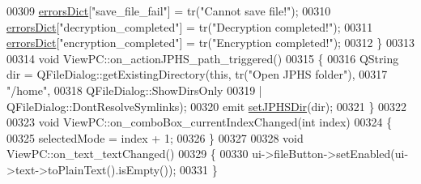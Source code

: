 \begin{DoxyCode}
00309     \hyperlink{class_view_p_c_aaf7f058e5589d65fec72a21abfd5629b}{errorsDict}[\textcolor{stringliteral}{"save\_file\_fail"}] = tr(\textcolor{stringliteral}{"Cannot save file!"});
00310     \hyperlink{class_view_p_c_aaf7f058e5589d65fec72a21abfd5629b}{errorsDict}[\textcolor{stringliteral}{"decryption\_completed"}] = tr(\textcolor{stringliteral}{"Decryption completed!"});
00311     \hyperlink{class_view_p_c_aaf7f058e5589d65fec72a21abfd5629b}{errorsDict}[\textcolor{stringliteral}{"encryption\_completed"}] = tr(\textcolor{stringliteral}{"Encryption completed!"});
00312 \}
00313 
00314 \textcolor{keywordtype}{void} ViewPC::on\_actionJPHS\_path\_triggered()
00315 \{
00316     QString dir = QFileDialog::getExistingDirectory(\textcolor{keyword}{this}, tr(\textcolor{stringliteral}{"Open JPHS folder"}),
00317                                                     \textcolor{stringliteral}{"/home"},
00318                                                     QFileDialog::ShowDirsOnly
00319                                                     | QFileDialog::DontResolveSymlinks);
00320     emit \hyperlink{class_view_p_c_ae81085836c0c01bc9556a5b27eb8d19c}{setJPHSDir}(dir);
00321 \}
00322 
00323 \textcolor{keywordtype}{void} ViewPC::on\_comboBox\_currentIndexChanged(\textcolor{keywordtype}{int} index)
00324 \{
00325     selectedMode = index + 1;
00326 \}
00327 
00328 \textcolor{keywordtype}{void} ViewPC::on\_text\_textChanged()
00329 \{
00330     ui->fileButton->setEnabled(ui->text->toPlainText().isEmpty());
00331 \}
\end{DoxyCode}
